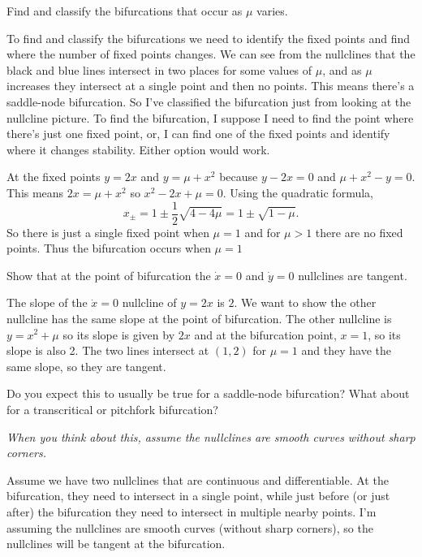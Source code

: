 \documentclass[12pt,letterpaper,answers]{exam}
\begin{document}
\begin{questions}
\begin{parts}
\begin{solution}
\end{solution}
\item Find and classify the bifurcations that occur as $\mu$ varies.

\begin{solution}
To find and classify the bifurcations we need to identify the fixed points and find where the number of fixed points changes.
We can see from the nullclines that the black and blue lines intersect in two places for some values of $\mu$, and as $\mu$ increases
they intersect at a single point and then no points.  This means there's a saddle-node bifurcation.  So I've classified the bifurcation just
from looking at the nullcline picture.  To find the bifurcation, I suppose I need to find the point where there's just one fixed point, or, I can
find one of the fixed points and identify where it changes stability.  Either option would work.

At the fixed points $y = 2x$ and $y = \mu + x^2$ because $y-2x = 0$ and $\mu + x^2 - y = 0$.
This means $2x = \mu + x^2$ so $x^2 - 2x + \mu = 0$.  Using the quadratic formula,
\[x_\pm = 1 \pm \frac{1}{2} \sqrt{4 - 4\mu} = 1\pm \sqrt{1 - \mu}.\]
So there is just a single fixed point when $\mu = 1$ and for $\mu >1$ there are no fixed points.  Thus the bifurcation occurs
when $\mu = 1$ %
\end{solution}

\item Show that at the point of bifurcation the $\dot{x}=0$ and $\dot{y}=0$ nullclines are tangent.  

\begin{solution}
The slope of the $\dot{x} = 0$ nullcline of $y = 2x$ is $2$.  We want to show the other nullcline has the same slope at the point
of bifurcation.  The other nullcline is $y = x^2 + \mu$ so its slope is given by $2x$ and at the bifurcation point, $x = 1$, so its slope is also 2.
The two lines intersect at $(1,2)$ for $\mu = 1$ and they have the same slope, so they are tangent.
\end{solution}

\item Do you expect this to usually be true for a saddle-node bifurcation?  What about for a transcritical or pitchfork bifurcation?

\emph{When you think about this, assume the nullclines are smooth curves without sharp corners.}

\begin{solution}
Assume we have two nullclines that are continuous and differentiable.  At the bifurcation, they need to intersect in a single point, while just before (or just after) the bifurcation they need to intersect in multiple nearby points.  I'm assuming the nullclines are smooth curves (without sharp corners), so the nullclines will be tangent at the bifurcation.


\end{solution}
\end{parts}
\end{questions}
\end{document}
